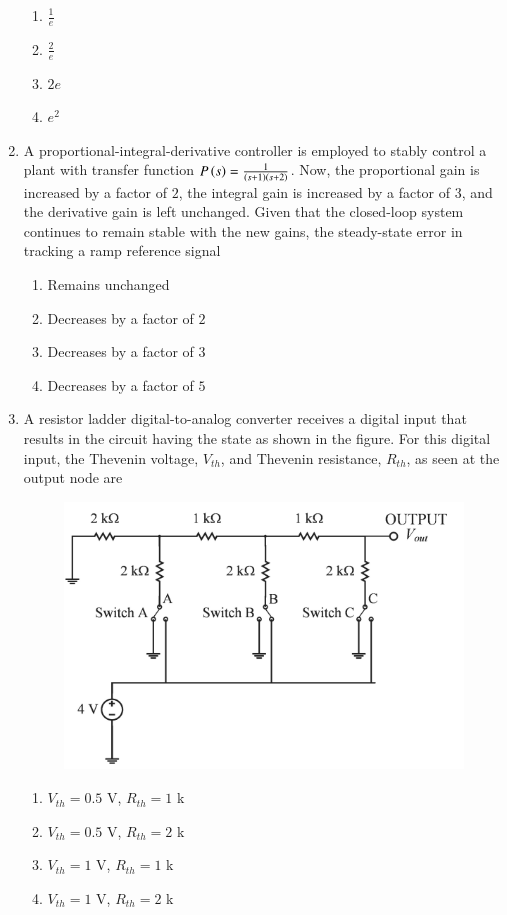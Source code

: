 \documentclass[journal,12pt,onecolumn]{IEEEtran}
\theoremstyle{remark}
\begin{document}
\begin{enumerate}
\hfill{}
\begin{enumerate}
\item $\frac{1}{e}$
\item $\frac{2}{e}$
\item $2e$
\item $e^2$
\end{enumerate}

\item A proportional-integral-derivative  controller is employed to stably control a plant with transfer function $P\left(s\right) = \frac{1}{\left(s+1\right)\left(s+2\right)}$. Now, the proportional gain is increased by a factor of $2$, the integral gain is increased by a factor of $3$, and the derivative gain is left unchanged. Given that the closed-loop system continues to remain stable with the new gains, the steady-state error in tracking a ramp reference signal \underline{\hspace{2cm}}

\hfill{}
\begin{enumerate}
\item Remains unchanged
\item Decreases by a factor of $2$
\item Decreases by a factor of $3$
\item Decreases by a factor of $5$
\end{enumerate}

\item A resistor ladder digital-to-analog converter  receives a digital input that results in the circuit having the state as shown in the figure. For this digital input, the Thevenin voltage, $V_{th}$, and Thevenin resistance, $R_{th}$, as seen at the output node are \underline{\hspace{2cm}}

\hfill{}
\begin{figure}[H]
\includegraphics[width = 0.5\columnwidth]{q42}
\caption*{}
\label{fig:q42}
\end{figure}
\begin{enumerate}
\item $V_{th} = 0.5$ V, $R_{th}= 1$ k\ohm
\item $V_{th}= 0.5$ V, $R_{th}= 2$ k\ohm
\item $V_{th}= 1$ V, $R_{th}= 1$ k\ohm
\item $V_{th}= 1$ V, $R_{th}= 2$ k\ohm
\end{enumerate}


\end{enumerate}
\end{document}
